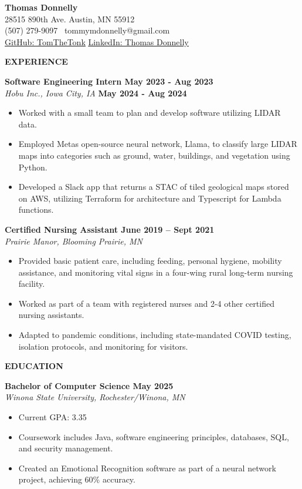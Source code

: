 \textbf{Thomas Donnelly}\\
28515 890th Ave. \textbar{} Austin, MN 55912\\
(507) 279-9097 \textbar~tommymdonnelly@gmail.com\\
\href{https://github.com/TomTheTonk}{\ul{GitHub: TomTheTonk}}
\href{http://linkedin.com/in/thomas-donnelly-429405320}{\ul{LinkedIn:
Thomas Donnelly}}

\textbf{EXPERIENCE}

\textbf{Software Engineering Intern May 2023 - Aug 2023}\\
\emph{Hobu Inc., Iowa City, IA} \textbf{May 2024 - Aug 2024}

\begin{itemize}
\item
  Worked with a small team to plan and develop software utilizing LIDAR
  data.
\item
  Employed Meta\textquotesingle s open-source neural network, Llama, to
  classify large LIDAR maps into categories such as ground, water,
  buildings, and vegetation using Python.
\item
  Developed a Slack app that returns a STAC of tiled geological maps
  stored on AWS, utilizing Terraform for architecture and Typescript for
  Lambda functions.
\end{itemize}

\textbf{Certified Nursing Assistant June 2019 -- Sept 2021}\\
\emph{Prairie Manor, Blooming Prairie, MN}

\begin{itemize}
\item
  Provided basic patient care, including feeding, personal hygiene,
  mobility assistance, and monitoring vital signs in a four-wing rural
  long-term nursing facility.
\item
  Worked as part of a team with registered nurses and 2-4 other
  certified nursing assistants.
\item
  Adapted to pandemic conditions, including state-mandated COVID
  testing, isolation protocols, and monitoring for visitors.
\end{itemize}

\textbf{EDUCATION}

\textbf{Bachelor of Computer Science May 2025}\\
\emph{Winona State University, Rochester/Winona, MN}

\begin{itemize}
\item
  Current GPA: 3.35
\item
  Coursework includes Java, software engineering principles, databases,
  SQL, and security management.
\item
  Created an Emotional Recognition software as part of a neural network
  project, achieving 60\% accuracy.
\end{itemize}

